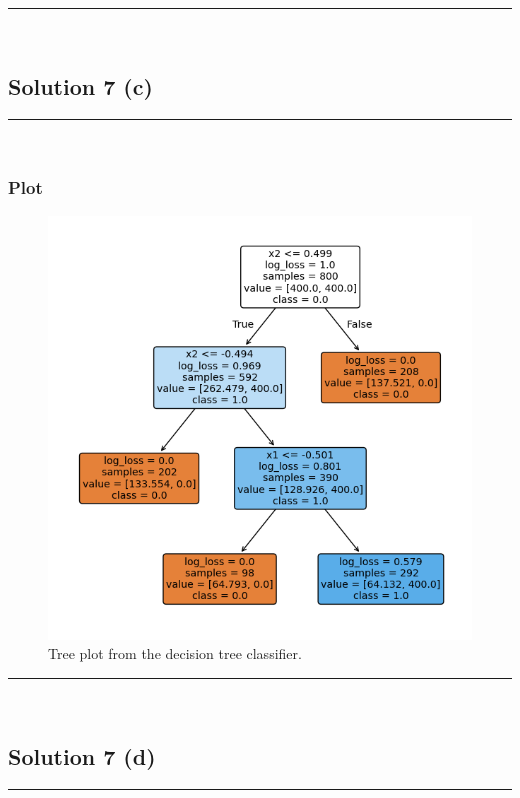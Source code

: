\documentclass{article}
\begin{document}
\noindent\rule{\textwidth}{0.4pt}\\

\newpage

\subsection*{Solution 7 (c)}
\noindent\rule{\textwidth}{0.4pt}\\

\subsubsection*{Plot}
\begin{figure}[H]
  \includegraphics{hw9_q7c.png}
  \caption{Tree plot from the decision tree classifier.}
\end{figure}

\noindent\rule{\textwidth}{0.4pt}\\

\newpage

\subsection*{Solution 7 (d)}
\noindent\rule{\textwidth}{0.4pt}\\
\end{document}
